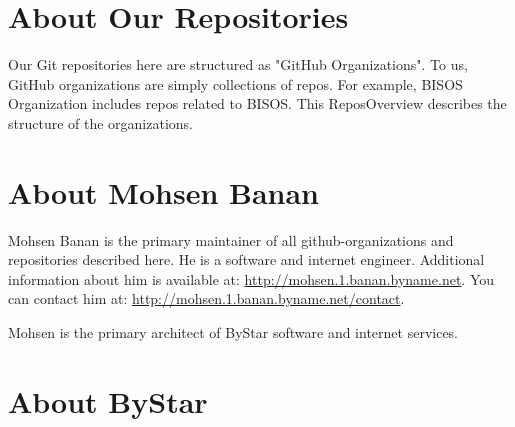 \section{About Our Repositories}

Our Git repositories here are structured as "GitHub Organizations". To
us, GitHub organizations are simply collections of repos. For example,
BISOS Organization includes repos related to BISOS. This ReposOverview
describes the structure of the organizations.

\begin{comment}
*  [[elisp:(org-cycle)][| ]] [[elisp:(org-show-subtree)][|=]] [[elisp:(show-children 10)][|V]] [[elisp:(bx:orgm:indirectBufOther)][|>]] [[elisp:(bx:orgm:indirectBufMain)][|I]] [[elisp:(blee:ppmm:org-mode-toggle)][|N]] [[elisp:(org-top-overview)][|O]] [[elisp:(progn (org-shifttab) (org-content))][|C]] [[elisp:(delete-other-windows)][|1]]  /Section/   About Mohsen Banan ::  [[elisp:(org-cycle)][| ]]
\end{comment}

\section{About Mohsen Banan}


Mohsen Banan is the primary maintainer of all github-organizations and
repositories described here. He is a software and internet engineer.
Additional information about him is available at: 
\url{http://mohsen.1.banan.byname.net}. You can contact him at:
\url{http://mohsen.1.banan.byname.net/contact}.

Mohsen is the primary architect of ByStar software and internet services.

\begin{comment}
*  [[elisp:(org-cycle)][| ]] [[elisp:(org-show-subtree)][|=]] [[elisp:(show-children 10)][|V]] [[elisp:(bx:orgm:indirectBufOther)][|>]] [[elisp:(bx:orgm:indirectBufMain)][|I]] [[elisp:(blee:ppmm:org-mode-toggle)][|N]] [[elisp:(org-top-overview)][|O]] [[elisp:(progn (org-shifttab) (org-content))][|C]] [[elisp:(delete-other-windows)][|1]]  /Section/   About ByStar ::  [[elisp:(org-cycle)][| ]]
\end{comment}

\section{About ByStar}

